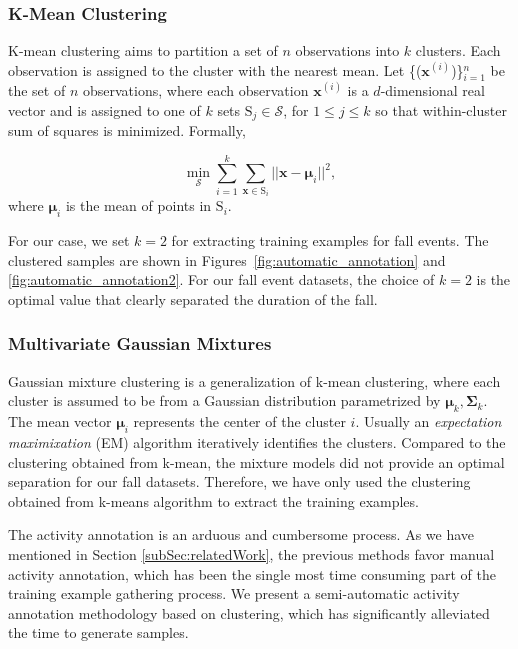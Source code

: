 \documentclass{IEEEtran}
\begin{document}
\subsubsection{K-Mean Clustering}
K-mean clustering aims to partition a set of $n$ observations into $k$ clusters. Each 
observation is assigned to the cluster with the nearest mean. Let 
\{($\mathbf{x}^{(i)}$)\}$_{i=1}^n$  be the set of $n$ 
observations, where each observation $\mathbf{x}^{(i)}$ is a $d$-dimensional real vector 
and is 
assigned to one of $k$ sets $\mathrm{S}_j \in \mathcal{S}$, for $ 1 \leq  j \leq k$ so 
that 
within-cluster 
sum of squares is minimized. Formally,

$$ \min _{\mathcal{S}} \sum_{i=1}^{k} \sum_{\mathbf{x} \in \mathrm{S}_i} || \mathbf{x} - 
\boldsymbol{\mu}_i 
||^2,$$
where $\boldsymbol{\mu}_i $ is the mean of points in $\mathrm{S}_i$.

For our case, we set $k = 2$ for extracting  training examples for fall events. The 
clustered samples are shown in Figures~\ref{fig:automatic_annotation} and 
\ref{fig:automatic_annotation2}. For our fall event datasets, the choice of $k=2$ is the 
optimal value that clearly separated the duration of the fall. 


\subsubsection{Multivariate Gaussian Mixtures}

Gaussian mixture clustering is a generalization of k-mean clustering, where each cluster 
is assumed to be from a Gaussian distribution parametrized by $\boldsymbol{\mu}_k, 
\boldsymbol{\Sigma}_k$. The mean vector $\boldsymbol{\mu}_i$ represents the center of the 
cluster $i$. 
Usually an \emph{expectation maximixation} (EM) algorithm iteratively identifies the 
clusters. Compared to the clustering obtained from k-mean, the mixture models did not 
provide an optimal separation for our fall datasets. Therefore, we have only used the 
clustering obtained from 
k-means algorithm to extract the training examples. 
 

The activity annotation is an arduous and cumbersome process. As we have mentioned in 
Section \ref{subSec:relatedWork}, the previous methods favor manual activity annotation, 
which has been the single most time consuming part of the training example gathering 
process. We present a semi-automatic activity annotation methodology based on 
clustering, which has 
significantly alleviated the time to generate samples. 
\end{document}

